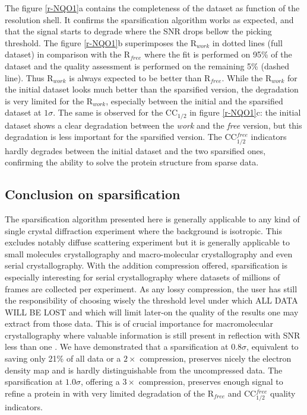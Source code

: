 \documentclass[preprint]{iucr}              %
\begin{document}
The figure \ref{r-NQO1}a contains the completeness of the dataset as function of the resolution shell. 
It confirms the sparsification algorithm works as expected, and that the signal starts to degrade where the SNR drops bellow the picking threshold. 
The figure \ref{r-NQO1}b superimposes the R$_{work}$ in dotted lines (full dataset) in comparison with the R$_{free}$ where the fit is performed on 95\% of the dataset and the quality assessment is performed on the remaining 5\% (dashed line).
Thus R$_{work}$ is always expected to be better than R$_{free}$.
While the R$_{work}$ for the initial dataset looks much better than the sparsified version, the degradation is very limited for the R$_{work}$, especially between the initial and the sparsified dataset at $1\sigma$.
The same is observed for the CC$_{1/2}$ in figure \ref{r-NQO1}c: the initial dataset shows a clear degradation between the \textit{work} and the \textit{free} version, but this degradation is less important for the sparsified version.
The CC$_{1/2}^{free}$ indicators hardly degrades between the initial dataset and the two sparsified ones, confirming the ability to solve the protein structure from sparse data.

\subsection{Conclusion on sparsification}
The sparsification algorithm presented here is generally applicable to any kind of single crystal diffraction experiment where the background is isotropic. 
This excludes notably diffuse scattering experiment but it is generally applicable to small molecules crystallography and macro-molecular crystallography and even serial crystallography.
With the addition compression offered, sparsification is especially interesting for serial crystallography where datasets of millions of frames are collected per experiment.
As any lossy compression, the user has still the responsibility of choosing wisely the threshold level under which ALL DATA WILL BE LOST and which will limit later-on the quality of the results one may extract from those data. 
This is of crucial importance for macromolecular crystallography where valuable information is still present in reflection with SNR less than one \cite{cc1/2}.
We have demonstrated that a sparsification at $0.8\sigma$, equivalent to saving only 21\% of all data
or a $2\times$ compression, preserves nicely the electron density map and is hardly distinguishable from the uncompressed data.
The sparsification at $1.0\sigma$, offering a $3\times$ compression, preserves enough signal to refine a protein in with very limited degradation of the R$_{free}$ and CC$_{1/2}^{free}$ quality indicators.
\end{document}
